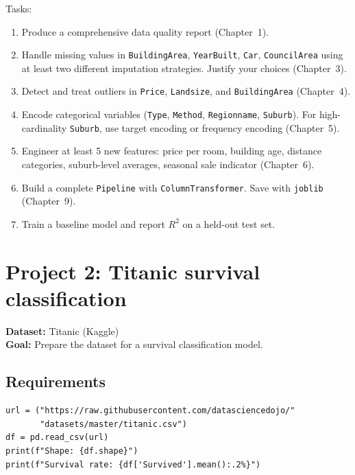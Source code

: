 Tasks:
\begin{enumerate}
  \item Produce a comprehensive data quality report (Chapter~1).
  \item Handle missing values in \texttt{BuildingArea}, \texttt{YearBuilt}, \texttt{Car}, \texttt{CouncilArea} using at least two different imputation strategies. Justify your choices (Chapter~3).
  \item Detect and treat outliers in \texttt{Price}, \texttt{Landsize}, and \texttt{BuildingArea} (Chapter~4).
  \item Encode categorical variables (\texttt{Type}, \texttt{Method}, \texttt{Regionname}, \texttt{Suburb}). For high-cardinality \texttt{Suburb}, use target encoding or frequency encoding (Chapter~5).
  \item Engineer at least 5 new features: price per room, building age, distance categories, suburb-level averages, seasonal sale indicator (Chapter~6).
  \item Build a complete \texttt{Pipeline} with \texttt{ColumnTransformer}. Save with \texttt{joblib} (Chapter~9).
  \item Train a baseline model and report $R^2$ on a held-out test set.
\end{enumerate}

\section{Project 2: Titanic survival classification}

\textbf{Dataset:} Titanic (Kaggle)\\
\textbf{Goal:} Prepare the dataset for a survival classification model.

\subsection{Requirements}

\begin{verbatim}
url = ("https://raw.githubusercontent.com/datasciencedojo/"
       "datasets/master/titanic.csv")
df = pd.read_csv(url)
print(f"Shape: {df.shape}")
print(f"Survival rate: {df['Survived'].mean():.2%}")
\end{verbatim}

